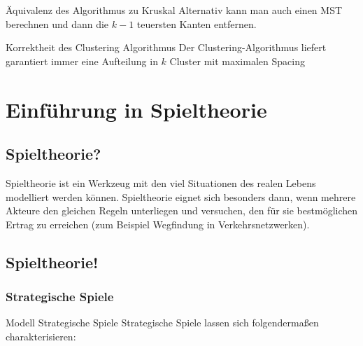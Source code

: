 \documentclass{panikzettel}
\newcommand{\boxspace}{	\vspace{-\baselineskip}	}
\begin{document}
{\begin{halfboxl}
\begin{theo}{Äquivalenz des Algorithmus zu Kruskal}
		Alternativ kann man auch einen MST berechnen und dann die $k-1$ teuersten Kanten entfernen.
	\end{theo}
\end{halfboxl}%
\begin{halfboxr}
	\boxspace
	
	\begin{theo}{Korrektheit des Clustering Algorithmus}
		Der Clustering-Algorithmus liefert garantiert immer eine Aufteilung in $k$ Cluster mit maximalen Spacing
	\end{theo}
\end{halfboxr}

\section{Einführung in Spieltheorie}

\subsection{Spieltheorie?}

Spieltheorie ist ein Werkzeug mit den viel Situationen des realen Lebens modelliert werden können. Spieltheorie eignet sich besonders dann, wenn mehrere Akteure den gleichen Regeln unterliegen und versuchen, den für sie bestmöglichen Ertrag zu erreichen (zum Beispiel Wegfindung in Verkehrsnetzwerken).

\subsection{Spieltheorie!}

\subsubsection{Strategische Spiele}

\begin{defi}{Modell Strategische Spiele}
	Strategische Spiele lassen sich folgendermaßen charakterisieren:
	

\end{defi}}
\end{document}
